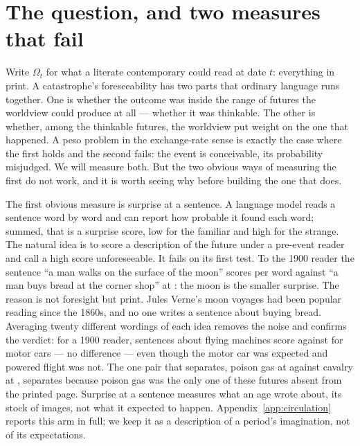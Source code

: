 \documentclass[11pt]{article}
\begin{document}
\section{The question, and two measures that fail}\label{sec:framework}

Write $\Omega_t$ for what a literate contemporary could read at date $t$: everything in print. A
catastrophe's foreseeability has two parts that ordinary language runs together. One is whether the
outcome was inside the range of futures the worldview could produce at all --- whether it was thinkable.
The other is whether, among the thinkable futures, the worldview put weight on the one that happened. A
peso problem in the exchange-rate sense \citep{krasker1980} is exactly the case where the first holds and
the second fails: the event is conceivable, its probability misjudged. We will measure both. But the two
obvious ways of measuring the first do not work, and it is worth seeing why before building the one that
does.

The first obvious measure is surprise at a sentence. A language model reads a sentence word by word and can
report how probable it found each word; summed, that is a surprise score, low for the familiar and high for
the strange. The natural idea is to score a description of the future under a pre-event reader and call a
high score unforeseeable. It fails on its first test. To the 1900 reader the sentence ``a man walks on the
surface of the moon'' scores \NmoonNineHundred{} per word against ``a man buys bread at the corner shop''
at \NbreadNineHundred{}: the moon is the smaller surprise. The reason is not foresight but print. Jules
Verne's moon voyages had been popular reading since the 1860s, and no one writes a sentence about buying
bread. Averaging twenty different wordings of each idea removes the noise and confirms the verdict: for a
1900 reader, sentences about flying machines score \NplaneNov{} against \NplaneFam{} for motor cars --- no
difference --- even though the motor car was expected and powered flight was not. The one pair that
separates, poison gas at \NgasNov{} against cavalry at \NgasFam{}, separates because poison gas was the
only one of these futures absent from the printed page. Surprise at a sentence measures what an age wrote
about, its stock of images, not what it expected to happen. Appendix~\ref{app:circulation} reports this arm
in full; we keep it as a description of a period's imagination, not of its expectations.
\end{document}
